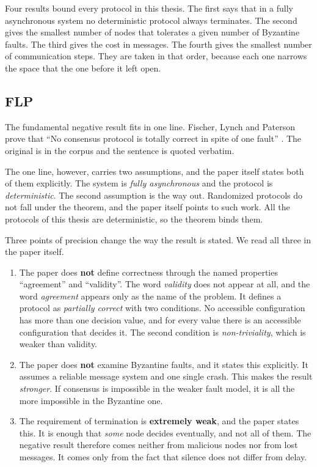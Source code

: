 Four results bound every protocol in this thesis. The first says that in
a fully asynchronous system no deterministic protocol always terminates.
The second gives the smallest number of nodes that tolerates a given
number of Byzantine faults. The third gives the cost in messages. The
fourth gives the smallest number of communication steps. They are taken
in that order, because each one narrows the space that the one before it
left open.

\subsection{FLP}

The fundamental negative result fits in one line. Fischer, Lynch and
Paterson prove that \enquote{No consensus protocol is totally correct in
spite of one fault} \cite{fischer1985impossibility}. The original is in
the corpus and the sentence is quoted verbatim.

The one line, however, carries two assumptions, and the paper itself
states both of them explicitly. The system is \emph{fully asynchronous}
and the protocol is \emph{deterministic}. The second assumption is the
way out. Randomized protocols do not fall under the theorem, and the
paper itself points to such work. All the protocols of this thesis are
deterministic, so the theorem binds them.

Three points of precision change the way the result is stated. We read
all three in the paper itself.

\begin{enumerate}
  \item The paper does \textbf{not} define correctness through the named
  properties \enquote{agreement} and \enquote{validity}. The word
  \emph{validity} does not appear at all, and the word \emph{agreement}
  appears only as the name of the problem. It defines a protocol as
  \emph{partially correct} with two conditions. No accessible
  configuration has more than one decision value, and for every value
  there is an accessible configuration that decides it. The second
  condition is \emph{non-triviality}, which is weaker than validity.
  \item The paper does \textbf{not} examine Byzantine faults, and it
  states this explicitly. It assumes a reliable message system and one
  single crash. This makes the result \emph{stronger}. If consensus is
  impossible in the weaker fault model, it is all the more impossible in
  the Byzantine one.
  \item The requirement of termination is \textbf{extremely weak}, and
  the paper states this. It is enough that \emph{some} node decides
  eventually, and not all of them. The negative result therefore comes
  neither from malicious nodes nor from lost messages. It comes only
  from the fact that silence does not differ from delay.
\end{enumerate}

